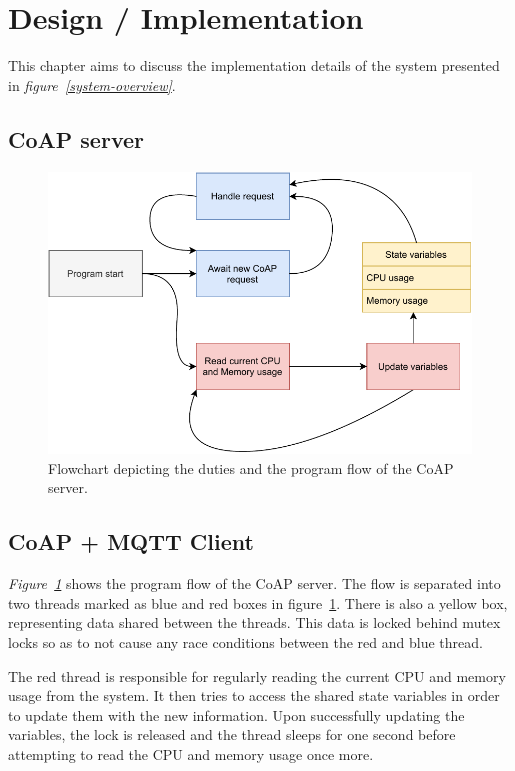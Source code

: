 \section{Design / Implementation}
\label{ch:impl}
\noindent	

This chapter aims to discuss the implementation details of the system presented in \textit{figure~\ref{system-overview}}.

\subsection{CoAP server}

\begin{figure}[H]
	\begin{center}
		\includegraphics[width=\textwidth]{./doc/coap_flowchart.pdf}
		\caption{Flowchart depicting the duties and the program flow of the CoAP server.}
		\label{coap-figure}
	\end{center}
\end{figure}

\subsection{CoAP + MQTT Client}

\textit{Figure~\ref{coap-figure}} shows the program flow of the CoAP server. The flow is separated into two threads marked as blue and red boxes in figure~\ref{coap-figure}. There is also a yellow box, representing data shared between the threads. This data is locked behind mutex locks so as to not cause any race conditions between the red and blue thread. 

The red thread is responsible for regularly reading the current CPU and memory usage from the system. It then tries to access the shared state variables in order to update them with the new information. Upon successfully updating the variables, the lock is released and the thread sleeps for one second before attempting to read the CPU and memory usage once more.

